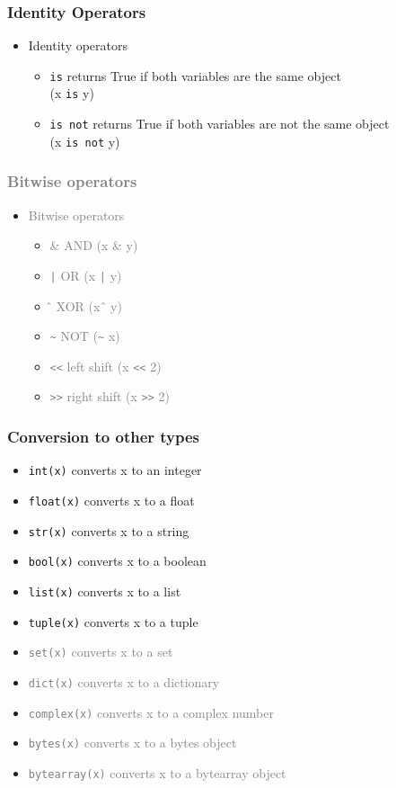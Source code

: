 \documentclass{beamer}
\begin{document}
\begin{frame}
  \frametitle{Identity Operators}
  \begin{itemize}
    \item Identity operators
    \begin{itemize}
      \item \texttt{is} returns True if both variables are the same object \\(x \texttt{is} y)
      \item \texttt{is not} returns True if both variables are not the same object \\(x \texttt{is not} y)
    \end{itemize}
  \end{itemize}
\end{frame}
\begin{frame}
  \frametitle{\textcolor{gray}{Bitwise operators}}
  \begin{itemize}
    \item \textcolor{gray}{Bitwise operators}
    \begin{itemize}
      \item \textcolor{gray}{\& AND (x \& y)}
      \item \textcolor{gray}{\texttt{|} OR (x \texttt{|} y)}
      \item \textcolor{gray}{\^ \, XOR (x \^ \, y)}
      \item \textcolor{gray}{\texttt{\~} NOT (\texttt{\~} x)}
      \item \textcolor{gray}{\texttt{<<} left shift (x \texttt{<<} 2)}
      \item \textcolor{gray}{\texttt{>>} right shift (x \texttt{>>} 2)}
    \end{itemize}
  \end{itemize}
\end{frame}

\begin{frame}
  \frametitle{Conversion to other types}
  \vspace*{-1cm}
  \begin{itemize}
    \item \texttt{int(x)} converts x to an integer
    \item \texttt{float(x)} converts x to a float
    \item \texttt{str(x)} converts x to a string
    \item \texttt{bool(x)} converts x to a boolean
    \item \texttt{list(x)} converts x to a list
    \item \texttt{tuple(x)} converts x to a tuple
    \item \textcolor{gray}{\texttt{set(x)} converts x to a set}
    \item \textcolor{gray}{\texttt{dict(x)} converts x to a dictionary}
    \item \textcolor{gray}{\texttt{complex(x)} converts x to a complex number}
    \item \textcolor{gray}{\texttt{bytes(x)} converts x to a bytes object}
    \item \textcolor{gray}{\texttt{bytearray(x)} converts x to a bytearray object}
  \end{itemize}
\end{frame}
\end{document}
